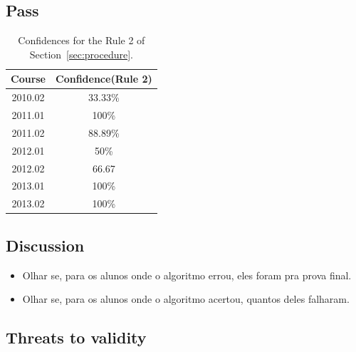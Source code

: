 \subsection{Pass}

\begin{table}[h]
\centering
\begin{tabular}{|c|c|}
\hline
\textbf{Course} & \textbf{Confidence(Rule 2)}\\ \hline
2010.02 & 33.33\% \\ \hline
2011.01 & 100\%  \\ \hline
2011.02 & 88.89\% \\ \hline
2012.01 & 50\%  \\ \hline
2012.02 & 66.67 \\ \hline
2013.01 & 100\% \\ \hline
2013.02 & 100\% \\ \hline
\end{tabular}
\caption{Confidences for the Rule 2 of Section~\ref{sec:procedure}.}
\label{tab:confidences}
\end{table}

\subsection{Discussion}

\begin{itemize}

	\item Olhar se, para os alunos onde o algoritmo errou, eles foram pra prova final.
	\item Olhar se, para os alunos onde o algoritmo acertou, quantos deles falharam.

\end{itemize}

\subsection{Threats to validity} 